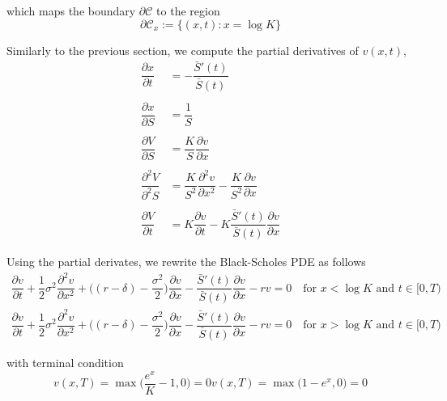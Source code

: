 which maps the boundary $\partial \mathcal{C}$ to the region
\begin{equation}
  \partial{\mathcal{C}_x} := \{ (x, t): x = \log{K} \}  
\end{equation}

\newpage

Similarly to the previous section, we compute the partial derivatives of $v(x,t)$,
\begin{align*}
  \dfrac{\partial x}{\partial t} &= -\dfrac{\bar{S}'(t) }{\bar{S}(t)} \\\\
  \dfrac{\partial x}{\partial S} &= \dfrac{1}{S} \\\\ 
  \dfrac{\partial V}{\partial S} &= \dfrac{K}{S} \dfrac{\partial v}{\partial x} \\\\
  \dfrac{\partial^2 V}{\partial^2 S} &= \dfrac{K}{S^2}\dfrac{\partial^2 v}{\partial x^2} - \dfrac{K}{S^2} \dfrac{\partial v}{\partial x} \\\\
  \dfrac{\partial V}{\partial t} &= K \dfrac{\partial v}{\partial t} - K\dfrac{\bar{S}'(t)}{\bar{S}(t)}\dfrac{\partial v}{\partial x}
\end{align*}

Using the partial derivates, we rewrite the Black-Scholes PDE as follows
\begin{subequations}
  \begin{align}
      \dfrac{\partial v}{\partial t} + \dfrac{1}{2}\sigma^2\dfrac{\partial^2 v}{\partial x^2} + \bigg((r-\delta) - \dfrac{\sigma^2}{2} \bigg)\dfrac{\partial v}{\partial x} -\dfrac{\bar{S}'(t)}{\bar{S}(t)}\dfrac{\partial v}{\partial x} - rv = 0 \quad \text{for $x < \log{K}$ and $t \in [0, T)$} \\
      \dfrac{\partial v}{\partial t} + \dfrac{1}{2}\sigma^2\dfrac{\partial^2 v}{\partial x^2} + \bigg((r-\delta) - \dfrac{\sigma^2}{2} \bigg)\dfrac{\partial v}{\partial x} -\dfrac{\bar{S}'(t)}{\bar{S}(t)}\dfrac{\partial v}{\partial x} - rv = 0 \quad \text{for $x > \log{K}$ and $t \in [0, T)$}
  \end{align}
\end{subequations}

with terminal condition
\begin{subequations} \label{eq:blackscholes:frontfixingmethod:logtransform:american_options_terminal_condition}
  \begin{equation}
    v(x, T) = \max\bigg(\dfrac{e^x}{K} - 1, 0\bigg) = 0
  \end{equation}
  \begin{equation}
    v(x, T) = \max\bigg(1 - e^x, 0\bigg) = 0
  \end{equation}
\end{subequations}


